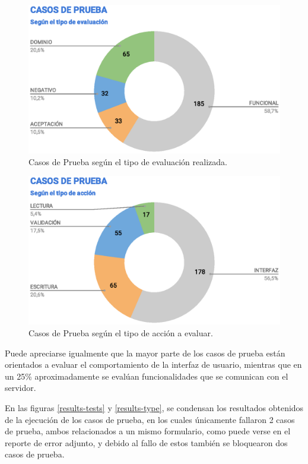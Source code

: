 \begin{figure}[H]
\centering
\includegraphics[width=1.0\textwidth]{graphics/tc-tests.eps}
\caption{Casos de Prueba según el tipo de evaluación realizada.}
\label{tc-tests}
\end{figure}

\begin{figure}[H]
\centering
\includegraphics[width=1.0\textwidth]{graphics/tc-type.eps}
\caption{Casos de Prueba según el tipo de acción a evaluar.}
\label{tc-type}
\end{figure}

Puede apreciarse igualmente que la mayor parte de los casos de prueba están
orientados a evaluar el comportamiento de la interfaz de usuario, mientras que
en un 25\% aproximadamente se evalúan funcionalidades que se comunican con el
servidor.

En las figuras \ref{results-tests} y \ref{results-type}, se condensan los
resultados obtenidos de la ejecución de los casos de prueba, en los cuales
únicamente fallaron 2 casos de prueba, ambos relacionados a un mismo formulario,
como puede verse en el reporte de error adjunto, y debido al fallo de estos
también se bloquearon dos casos de prueba.

